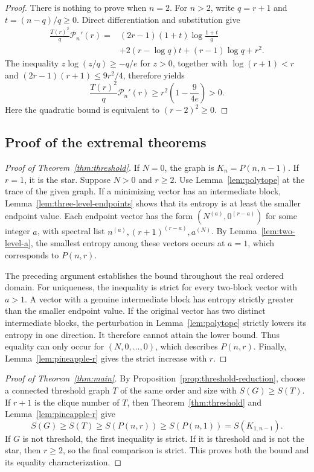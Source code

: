 \documentclass[11pt,a4paper,reqno]{amsart}
\theoremstyle{remark}
\newcommand{\Ent}{S}
\newcommand{\Pine}{P}
\numberwithin{equation}{section}
\begin{document}
\begin{proof}
There is nothing to prove when $n=2$. For $n>2$, write $q=r+1$ and
$t=(n-q)/q\ge0$. Direct differentiation and substitution give
\begin{align*}
 \frac{T(r)^2}{q}\mathcal P_n'(r)
 ={}&(2r-1)(1+t)\log\frac{1+t}{q}\\
    &+2(r-\log q)t+(r-1)\log q+r^2.
\end{align*}
The inequality $z\log(z/q)\ge-q/e$ for $z>0$, together with
$\log(r+1)<r$ and $(2r-1)(r+1)\le9r^2/4$, therefore yields
\[
 \frac{T(r)^2}{q}\mathcal P_n'(r)
 \ge r^2\left(1-\frac9{4e}\right)>0.
\]
Here the quadratic bound is equivalent to $(r-2)^2\ge0$.
\end{proof}


\subsection{Proof of the extremal theorems}\label{subsec:completion}
\begin{proof}[Proof of Theorem~\ref{thm:threshold}]
If $N=0$, the graph is $K_n=\Pine(n,n-1)$. If $r=1$, it is the star.
Suppose $N>0$ and $r\ge2$. Use Lemma~\ref{lem:polytope} at the trace
of the given graph. If a minimizing vector has an intermediate block,
Lemma~\ref{lem:three-level-endpoints} shows that its entropy is at least
the smaller endpoint value. Each endpoint vector has the form
$(N^{(a)},0^{(r-a)})$ for some integer $a$,
with spectral list $n^{(a)},(r+1)^{(r-a)},a^{(N)}$.
By Lemma~\ref{lem:two-level-a}, the smallest entropy among these vectors
occurs at $a=1$, which corresponds to $\Pine(n,r)$.

The preceding argument establishes the bound throughout the real ordered
domain. For uniqueness, the inequality is strict for every two-block
vector with $a>1$. A vector with a genuine intermediate block has entropy
strictly greater than the smaller endpoint value. If the original vector
has two distinct intermediate blocks, the perturbation in
Lemma~\ref{lem:polytope} strictly lowers its entropy in one direction.
It therefore cannot attain the lower bound.
Thus equality can only occur for $(N,0,\ldots,0)$, which describes $\Pine(n,r)$.
Finally, Lemma~\ref{lem:pineapple-r} gives the strict increase with $r$.
\end{proof}

\begin{proof}[Proof of Theorem~\ref{thm:main}]
By Proposition~\ref{prop:threshold-reduction}, choose a connected
threshold graph $T$ of the same order and size with
$\Ent(G)\ge\Ent(T)$. If $r+1$ is the clique number of $T$, then
Theorem~\ref{thm:threshold} and Lemma~\ref{lem:pineapple-r} give
\[
 \Ent(G)\ge\Ent(T)\ge\Ent(\Pine(n,r))
 \ge\Ent(\Pine(n,1))=\Ent(K_{1,n-1}).
\]
If $G$ is not threshold, the first inequality is strict. If it is
threshold and is not the star, then $r\ge2$, so the final comparison is
strict. This proves both the bound and its equality characterization.
\end{proof}
\end{document}
